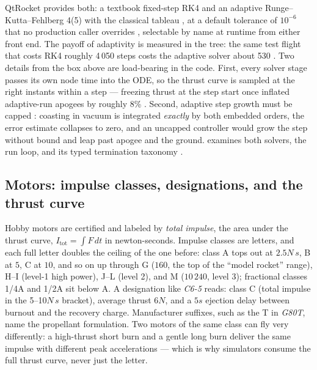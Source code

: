 QtRocket provides both: a textbook fixed-step RK4  and an adaptive
Runge--Kutta--Fehlberg 4(5) with the classical tableau , at a
default tolerance of $10^{-6}$ that no production caller overrides , selectable by name
at runtime from either front end. The payoff of adaptivity is measured in the tree: the
same test flight that costs RK4 roughly 4\,050 steps costs the adaptive solver about 530
. Two details from the box above are
load-bearing in the code. First, every solver stage passes its own node time into the ODE,
so the thrust curve is sampled at the right instants within a step 
--- freezing thrust at the step start once inflated adaptive-run apogees by roughly 8\%
. Second, adaptive step growth must be capped
: coasting in vacuum is integrated \emph{exactly} by both
embedded orders, the error estimate collapses to zero, and an uncapped controller would
grow the step without bound and leap past apogee and the ground. 
examines both solvers, the run loop, and its typed termination taxonomy
.

\subsection{Motors: impulse classes, designations, and the thrust
curve}\label{sec:primer-motors}

\begin{physbox}
Hobby motors are certified and labeled by \emph{total impulse}, the area under the thrust
curve, $I_{\text{tot}} = \int F\,dt$ in newton-seconds. Impulse classes are letters, and
each full letter doubles the ceiling of the one before: class A tops out at
$2.5\unit{N\,s}$, B at $5$, C at $10$, and so on up through G ($160$, the top of the
``model rocket'' range), H--I (level-1 high power), J--L (level 2), and M ($10\,240$,
level 3); fractional classes 1/4A and 1/2A sit below A. A designation like \emph{C6-5}
reads: class C (total impulse in the 5--10$\unit{N\,s}$ bracket), average thrust
$6\unit{N}$, and a $5\unit{s}$ ejection delay between burnout and the recovery charge.
Manufacturer suffixes, such as the T in \emph{G80T}, name the propellant formulation. Two
motors of the same class can fly very differently: a high-thrust short burn and a gentle
long burn deliver the same impulse with different peak accelerations --- which is why
simulators consume the full thrust curve, never just the letter.
\end{physbox}

